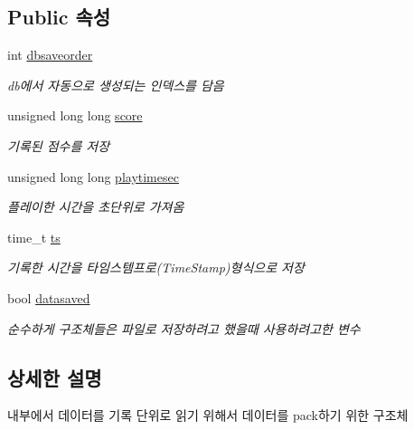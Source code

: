 \subsection*{Public 속성}
\begin{DoxyCompactItemize}
\item 
int \hyperlink{struct_tetris_1_1_d_b_management_1_1_score_board_attributes_a8fcc24de440dcae3e369df28485cde4d}{dbsaveorder}
\begin{DoxyCompactList}\small\item\em db에서 자동으로 생성되는 인덱스를 담음 \end{DoxyCompactList}\item 
unsigned long long \hyperlink{struct_tetris_1_1_d_b_management_1_1_score_board_attributes_acca4d00875cd210845e3ed2532ed276a}{score}
\begin{DoxyCompactList}\small\item\em 기록된 점수를 저장 \end{DoxyCompactList}\item 
unsigned long long \hyperlink{struct_tetris_1_1_d_b_management_1_1_score_board_attributes_a1534fca0e7a2795c055de645cba2ea18}{playtimesec}
\begin{DoxyCompactList}\small\item\em 플레이한 시간을 초단위로 가져옴 \end{DoxyCompactList}\item 
time\+\_\+t \hyperlink{struct_tetris_1_1_d_b_management_1_1_score_board_attributes_a79b3c0fb31de1f4fd878b90695480b75}{ts}
\begin{DoxyCompactList}\small\item\em 기록한 시간을 타임스템프로(\+Time\+Stamp)형식으로 저장 \end{DoxyCompactList}\item 
bool \hyperlink{struct_tetris_1_1_d_b_management_1_1_score_board_attributes_a0ac70e57809cf25a2b6a4c224a951497}{datasaved}
\begin{DoxyCompactList}\small\item\em 순수하게 구조체들은 파일로 저장하려고 했을때 사용하려고한 변수 \end{DoxyCompactList}\end{DoxyCompactItemize}


\subsection{상세한 설명}
내부에서 데이터를 기록 단위로 읽기 위해서 데이터를 pack하기 위한 구조체 


